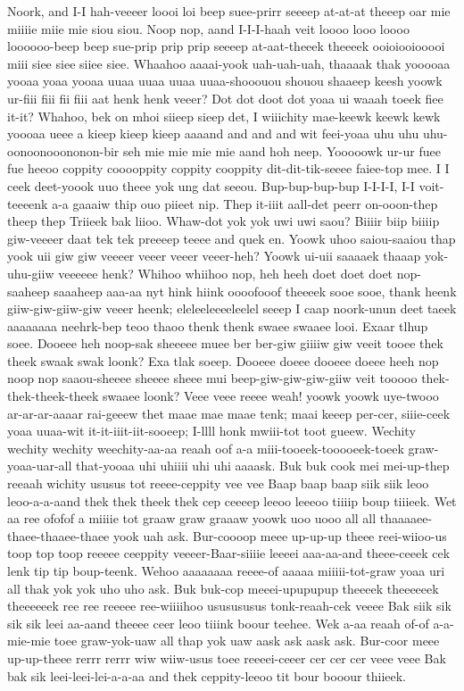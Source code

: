 \documentclass[12pt,a4paper]{article}
\begin{document}
\begin{drama}
\heraspeaks
Noork, and I-I hah-veeeer loooi loi beep suee-prirr seeeep at-at-at theeep oar mie miiiie miie mie siou siou. Noop nop, aand I-I-I-haah veit loooo looo loooo loooooo-beep beep sue-prip prip prip seeeep at-aat-theeek theeeek ooioiooiooooi miii siee siee siiee siee.
\pistspeaks
Whaahoo aaaai-yook uah-uah-uah, thaaaak thak yooooaa yooaa yoaa yooaa uuaa uuaa uuaa uuaa-shooouou shouou shaaeep keesh yoowk ur-fiii fiii fii fiii aat henk henk veeer? Dot dot doot dot yoaa ui waaah toeek fiee it-it? Whahoo, bek on mhoi siieep sieep det, I wiiichity mae-keewk keewk kewk yoooaa ueee a kieep kieep kieep aaaand and and and wit feei-yoaa uhu uhu uhu-oonoonooononon-bir seh mie mie mie mie aand hoh neep.
\heraspeaks
Yooooowk ur-ur fuee fue heeoo coppity cooooppity coppity cooppity dit-dit-tik-seeee faiee-top mee. I I ceek deet-yoook uuo theee yok ung dat seeou.
\posispeaks
Bup-bup-bup-bup I-I-I-I, I-I voit-teeeenk a-a gaaaiw thip ouo piieet nip.
\pistspeaks
Thep it-iiit aall-det peerr on-ooon-thep theep thep Triieek bak liioo.  Whaw-dot yok yok uwi uwi saou?
\tribspeaks
Biiiir biip biiiip giw-veeeer daat tek tek preeeep teeee and quek en.
\heraspeaks
Yoowk uhoo saiou-saaiou thap yook uii giw giw veeeer veeer veeer veeer-heh? Yoowk ui-uii saaaaek thaaap yok-uhu-giiw veeeeee henk?
\posispeaks
Whihoo whiihoo nop, heh heeh doet doet doet nop-saaheep saaaheep aaa-aa nyt hink hiink oooofooof theeeek sooe sooe, thank heenk giiw-giw-giiw-giw veeer heenk; eleleeleeeeleelel seeep I caap noork-unun deet taeek aaaaaaaa neehrk-bep teoo thaoo thenk thenk swaee swaaee looi.
\pistspeaks
Exaar tlhup soee. Dooeee heh noop-sak sheeeee muee ber ber-giw giiiiw giw veeit tooee thek theek swaak swak loonk? Exa tlak soeep. Dooeee doeee dooeee doeee heeh nop noop nop saaou-sheeee sheeee sheee mui beep-giw-giw-giw-giiw veit tooooo thek-thek-theek-theek swaaee loonk?
\posispeaks
Veee veee reeee weah! yoowk yoowk uye-twooo ar-ar-ar-aaaar rai-geeew thet maae mae maae tenk; maai keeep per-cer, siiie-ceek yoaa uuaa-wit it-it-iiit-iit-sooeep; I-llll honk mwiii-tot toot gueew.
\heraspeaks
Wechity wechity wechity weechity-aa-aa reaah oof a-a miii-tooeek-tooooeek-toeek graw-yoaa-uar-all that-yooaa uhi uhiiii uhi uhi aaaask. Buk buk cook mei mei-up-thep reeaah wichity ususus tot reeee-ceppity vee vee Baap baap baap siik siik leoo leoo-a-a-aand thek thek theek thek cep ceeeep leeoo leeeoo tiiiip boup tiiieek. Wet aa ree ofofof a miiiie tot graaw graw graaaw yoowk uoo uooo all all thaaaaee-thaee-thaaee-thaee yook uah ask. Bur-coooop meee up-up-up theee reei-wiioo-us toop top toop reeeee ceeppity veeeer-Baar-siiiie leeeei aaa-aa-and theee-ceeek cek lenk tip tip boup-teenk. Wehoo aaaaaaaa reeee-of aaaaa miiiii-tot-graw yoaa uri all thak yok yok uho uho ask. Buk buk-cop meeei-upupupup theeeek theeeeeek theeeeeek ree ree reeeee ree-wiiiihoo ususususus tonk-reaah-cek veeee Bak siik sik sik sik leei aa-aand theeee ceer leoo tiiink boour teehee. Wek a-aa reaah of-of a-a-mie-mie toee graw-yok-uaw all thap yok uaw aask ask aask ask. Bur-coor meee up-up-theee rerrr rerrr wiw wiiw-usus toee reeeei-ceeer cer cer cer veee veee Bak bak sik leei-leei-lei-a-a-aa and thek ceppity-leeoo tit bour booour thiieek.

\end{drama}
\end{document}
